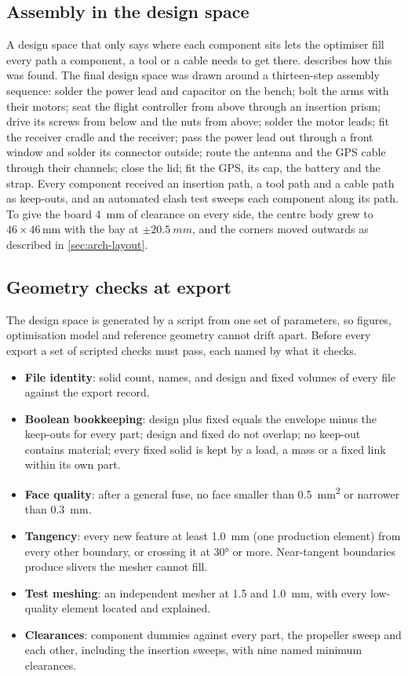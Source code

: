 \subsection{Assembly in the design space}

A design space that only says where each component sits lets the optimiser fill every path a component, a tool or a cable needs to get there.  describes how this was found. The final design space was drawn around a thirteen-step assembly sequence: solder the power lead and capacitor on the bench; bolt the arms with their motors; seat the flight controller from above through an insertion prism; drive its screws from below and the nuts from above; solder the motor leads; fit the receiver cradle and the receiver; pass the power lead out through a front window and solder its connector outside; route the antenna and the GPS cable through their channels; close the lid; fit the GPS, its cap, the battery and the strap. Every component received an insertion path, a tool path and a cable path as keep-outs, and an automated clash test sweeps each component along its path. To give the board \SI{4}{mm} of clearance on every side, the centre body grew to $46\times46$\,mm with the bay at $\pm\SI{20.5}{mm}$, and the corners moved outwards as described in \cref{sec:arch-layout}.

\subsection{Geometry checks at export}

The design space is generated by a script from one set of parameters, so figures, optimisation model and reference geometry cannot drift apart. Before every export a set of scripted checks must pass, each named by what it checks.
\begin{itemize}
\item \textbf{File identity}: solid count, names, and design and fixed volumes of every file against the export record.
\item \textbf{Boolean bookkeeping}: design plus fixed equals the envelope minus the keep-outs for every part; design and fixed do not overlap; no keep-out contains material; every fixed solid is kept by a load, a mass or a fixed link within its own part.
\item \textbf{Face quality}: after a general fuse, no face smaller than \SI{0.5}{mm^2} or narrower than \SI{0.3}{mm}.
\item \textbf{Tangency}: every new feature at least \SI{1.0}{mm} (one production element) from every other boundary, or crossing it at \ang{30} or more. Near-tangent boundaries produce slivers the mesher cannot fill.
\item \textbf{Test meshing}: an independent mesher at 1.5 and \SI{1.0}{mm}, with every low-quality element located and explained.
\item \textbf{Clearances}: component dummies against every part, the propeller sweep and each other, including the insertion sweeps, with nine named minimum clearances.
\end{itemize}

